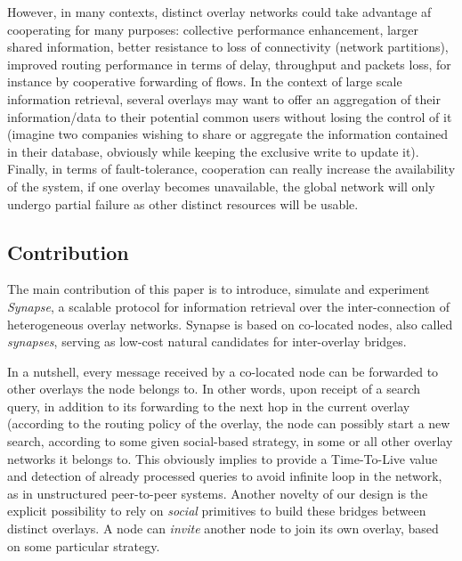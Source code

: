 However, in many contexts, distinct overlay networks could take
advantage af cooperating for many purposes: collective performance
enhancement, larger shared information, better resistance to loss of
connectivity (network partitions), improved routing performance in
terms of delay, throughput and packets loss, for instance by
cooperative forwarding of flows. In the context of large scale
information retrieval, several overlays may want to offer an
aggregation of their information/data to their potential common users
without losing the control of it (imagine two companies wishing to
share or aggregate the information contained in their database,
obviously while keeping the exclusive write to update it). Finally, in
terms of fault-tolerance, cooperation can really increase the
availability of the system, if one overlay becomes unavailable, the
global network will only undergo partial failure as other distinct
resources will be usable.




\medskip
\subsection{Contribution}
The main contribution of this paper is to introduce, simulate and
experiment \emph{Synapse}, a scalable protocol for information
retrieval over the inter-connection of heterogeneous overlay
networks. Synapse is based on co-located nodes, also called
\emph{synapses}, serving as low-cost natural candidates for
inter-overlay bridges.

In a nutshell, every message received by a co-located node can be
forwarded to other overlays the node belongs to. In other words, upon
receipt of a search query, in addition to its forwarding to the next
hop in the current overlay (according to the routing policy of the
overlay, the node can possibly start a new search, according to some
given social-based strategy, in some or all other overlay networks it
belongs to. This obviously implies to provide a Time-To-Live value and
detection of already processed queries to avoid infinite loop in the
network, as in unstructured peer-to-peer systems. Another novelty of
our design is the explicit possibility to rely on \emph{social}
primitives to build these bridges between distinct overlays. A node
can \emph{invite} another node to join its own overlay, based on some
particular strategy.

